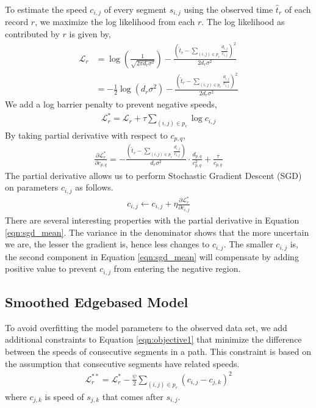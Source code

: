 \documentclass{sig-alternate}
\begin{document}
To estimate the speed $c_{i,j}$ of every segment $s_{i,j}$ using the observed time $\hat{t}_r$ of each record $r$, we maximize the log likelihood from each $r$. The log likelihood as contributed by $r$ is given by,
\begin{align*}
	\mathcal{L}_r &= \log \left( \frac{1}{\sqrt{2 \pi d_r \sigma^2 }} \right) - \frac{\left( \hat{t}_r - \sum_{ (i,j) \in p_r } \frac{d_{i,j}}{c_{i,j}} \right)^2}{2 d_r \sigma^2 } \\
	&= - \frac{1}{2} \log \left( d_r \sigma^2 \right) - \frac{\left( \hat{t}_r - \sum_{ (i,j) \in p_r } \frac{d_{i,j}}{c_{i,j}} \right)^2}{2 d_r \sigma^2 }
\end{align*}
We add a log barrier penalty to prevent negative speeds,
\begin{align}
	\label{eqn:objective1}
	\mathcal{L}^*_r = \mathcal{L}_r + \tau \sum_{(i,j) \in p_r} \log c_{i,j}
\end{align}
By taking partial derivative with respect to $c_{p,q}$,
\begin{align}
	\label{eqn:sgd_mean}
	\frac{\partial \mathcal{L}^*_r}{\partial c_{p,q}} = - \frac{\left( \hat{t}_r - \sum_{ (i,j) \in p_r } \frac{d_{i,j}}{c_{i,j}} \right)}{d_r \sigma^2 } \cdot \frac{d_{p,q}}{c_{p,q}^2} + \frac{\tau}{c_{p,q}}
\end{align}
The partial derivative allows us to perform Stochastic Gradient Descent (SGD) on parameters $c_{i,j}$ as follows.
\begin{align}
	\label{eqn:update}
	c_{i,j} \leftarrow c_{i,j} + \eta \frac{\partial \mathcal{L}^*_r}{\partial c_{i,j}}
\end{align}
There are several interesting properties with the partial derivative in Equation \ref{eqn:sgd_mean}. The variance in the denominator shows that the more uncertain we are, the lesser the gradient is, hence less changes to $c_{i,j}$. The smaller $c_{i,j}$ is, the second component in Equation \ref{eqn:sgd_mean} will compensate by adding positive value to prevent $c_{i,j}$ from entering the negative region.

\subsection{Smoothed Edgebased Model}

To avoid overfitting the model parameters to the observed data set, we add additional constraints to Equation \ref{eqn:objective1} that minimize the difference between the speeds of consecutive segments in a path. This constraint is based on the assumption that consecutive segments have related speeds.
\begin{align*}
	\mathcal{L}^{**}_r = \mathcal{L}^*_r - \frac{\psi}{2} \sum_{(i,j) \in p_r} \left( c_{i,j} - c_{j,k} \right)^2
\end{align*}
where $c_{j,k}$ is speed of $s_{j,k}$ that comes after $s_{i,j}$.
\end{document}
